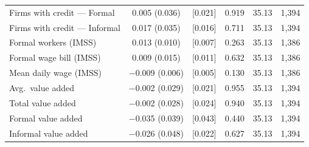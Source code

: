 \begin{threeparttable}
\begin{tabular}{lccccr}
        Firms with credit --- Formal    & \phantom{$-$}0.005          (0.036) & [0.021]          & 0.919 & 35.13 & 1{,}394 \\
        Firms with credit --- Informal  & \phantom{$-$}0.017          (0.035) & [0.016]          & 0.711 & 35.13 & 1{,}394 \\
        \midrule
        Formal workers (IMSS)           & \phantom{$-$}0.013          (0.010) & [0.007]\sym{*}   & 0.263 & 35.13 & 1{,}386 \\
        Formal wage bill (IMSS)         & \phantom{$-$}0.009          (0.015) & [0.011]          & 0.632 & 35.13 & 1{,}386 \\
        Mean daily wage (IMSS)          & $-$0.009\sym{*}   (0.006) & [0.005]\sym{*}   & 0.130 & 35.13 & 1{,}386 \\
        Avg.\ value added               & $-$0.002          (0.029) & [0.021]          & 0.955 & 35.13 & 1{,}394 \\
        Total value added               & $-$0.002          (0.028) & [0.024]          & 0.940 & 35.13 & 1{,}394 \\
        Formal value added              & $-$0.035          (0.039) & [0.043]          & 0.440 & 35.13 & 1{,}394 \\
        Informal value added            & $-$0.026          (0.048) & [0.022]          & 0.627 & 35.13 & 1{,}394 \\
        \bottomrule
    \end{tabular}
    \begin{tablenotes}[flushleft]
        \footnotesize

\end{tablenotes}
\end{threeparttable}
